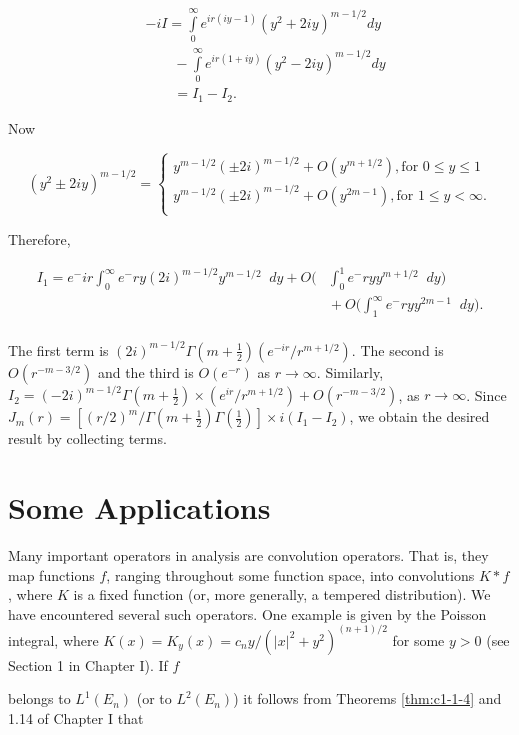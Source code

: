 \[
\begin{aligned}&-i I=\int\limits_{0}^{\infty}e^{i r(i y-1)}(y^{2}+2i y)^{m-1/2}d y\\
&\qquad-\int\limits_{0}^{\infty}e^{i r(1+i y)}(y^{2}-2i y)^{m-1/2}d y\\
&\qquad=I_{1}-I_{2}.\end{aligned}
\]

Now

\[
(y^{2}\pm2i y)^{m-1/2}=\left\{\begin{matrix}{y^{m-1/2}(\pm2i)^{m-1/2}+O(y^{m+1/2}),\text{for }0\leq y\leq1}\\ {y^{m-1/2}(\pm2i)^{m-1/2}+O(y^{2m-1}),\text{for }1\leq y<\infty.}\\ \end{matrix}\right.
\]

Therefore,

\[
\begin{aligned}{I_{1}= e^-ir\int_{0}^{\infty}e^-ry(2i)^{m-1/2}y^{m-1/2}\mathop{}{d}y+O\bigg(}&{{}\int_{0}^{1}e^-ryy^{m+1/2}\mathop{}{d}y\bigg)}\\ {}&{{}+O\bigg(\int_{1}^{\infty}e^-ryy^{2m-1}\mathop{}{d}y\bigg).}\\ \end{aligned}
\]

The first term is $(2i)^{m-1/2}\Gamma(m+\frac{1}{2})(e^{-ir}/r^{m+1/2})$. The second is $O(r^{-m-3/2})$ and the third is $O(e^{-r})$ as $r\to\infty$. Similarly, $I_{2}=(-2i)^{m-1/2}\Gamma(m+\frac{1}{2})\times(e^{ir}/r^{m+1/2})+O(r^{-m-3/2})$, as $r\to\infty$. Since $J_{m}(r)=[(r/2)^{m}/\Gamma(m+\frac{1}{2})\Gamma(\frac{1}{2})]\times i(I_{1}-I_{2})$, we obtain the desired result by collecting terms.

\section{Some Applications}

Many important operators in analysis are convolution operators. That is, they map functions $f$, ranging throughout some function space, into convolutions $K* f$, where $K$ is a fixed function (or, more generally, a tempered distribution). We have encountered several such operators. One example is given by the Poisson integral, where $K(x) = K_y(x) = c_ny/(|x|^2 + y^2)^{(n+1)/2}$ for some $y > 0$ (see Section 1 in Chapter I). If $f$

belongs to $L^{1}(E_{n})$ (or to $L^{2}(E_{n})$) it follows from Theorems \ref{thm:c1-1-4} and 1.14 of Chapter I that

